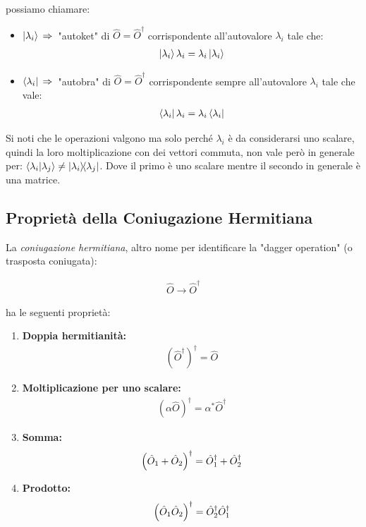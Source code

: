 	possiamo chiamare:
	
\begin{itemize}
	\item $\ket{\lambda_i} \, \Rightarrow \, $ "autoket" di $\hat{O} = \hat{O}^{\dagger} $ corrispondente all'autovalore $\lambda_i$ tale che:
	\begin{align*}
		\ket{\lambda_i} \lambda_i = \lambda_i \ket{\lambda_i}
	\end{align*}
	\item $\bra{\lambda_i} \, \Rightarrow \, $ "autobra" di $\hat{O} = \hat{O}^{\dagger} $ corrispondente sempre all'autovalore $\lambda_i$ tale che vale:
	\begin{align*}
		\bra{\lambda_i} \lambda_i = \lambda_i \bra{\lambda_i}
	\end{align*}
\end{itemize}
	
	Si noti che le operazioni valgono ma solo perché $\lambda_i$ è da considerarsi uno scalare, quindi la loro moltiplicazione con dei vettori commuta, non vale però in generale per: $\braket{\lambda_i}{\lambda_j} \neq \ketbra{\lambda_i}{\lambda_j}$. Dove il primo è uno scalare mentre il secondo in generale è una matrice. 
	
\subsection{Proprietà della Coniugazione Hermitiana}

	La \textit{coniugazione hermitiana}, altro nome per identificare la "dagger operation" (o trasposta coniugata):
	
\begin{align*}
	\hat{O} \to \hat{O}^{\dagger} 
\end{align*}

	ha le seguenti proprietà:
	
\begin{enumerate}[label=\arabic*)]
	\item \textbf{Doppia hermitianità:}
	\begin{align*}
		(\hat{O}^{\dagger})^\dagger = \hat{O}
	\end{align*}	
	
	\item \textbf{Moltiplicazione per uno scalare:}
	\begin{align*}
		(\alpha \hat{O})^{\dagger} = \alpha^* \hat{O}^{\dagger}
	\end{align*}
	
	\item \textbf{Somma:}
	\begin{align*}
		\qty(\hat{O}_1 + \hat{O}_2)^{\dagger} = \hat{O}_1^{\dagger} + \hat{O}_2^{\dagger}
	\end{align*}
	
	\item \textbf{Prodotto:}
	\begin{align*}
		\qty(\hat{O}_1 \hat{O}_2 )^{\dagger} = \hat{O}_2^{\dagger} \hat{O}_1^{\dagger}
	\end{align*}

\end{enumerate}

